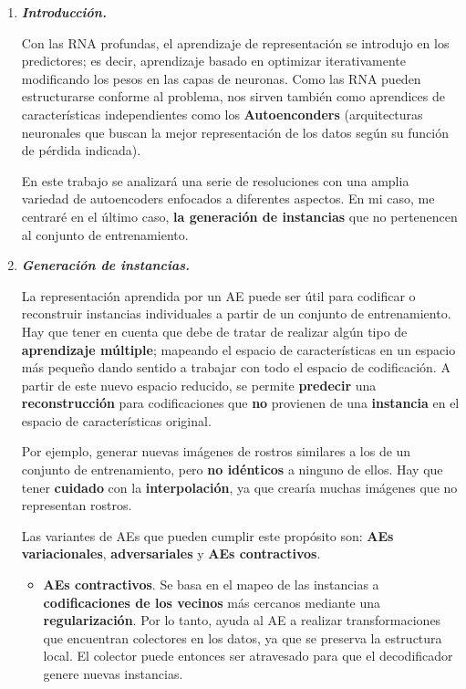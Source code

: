 \begin{enumerate}
    \item \textbf{\textit{Introducción.}}
    \par
    Con las RNA profundas, el aprendizaje de representación se introdujo en los predictores; es decir, aprendizaje basado en optimizar iterativamente modificando los pesos en las capas de neuronas. Como las RNA pueden estructurarse conforme al problema, nos sirven también como aprendices de características independientes como los \textbf{Autoenconders} (arquitecturas neuronales que buscan la mejor representación de los datos según su función de pérdida indicada).
    
    En este trabajo se analizará una serie de resoluciones con una amplia variedad de autoencoders enfocados a diferentes aspectos. En mi caso, me centraré en el último caso, \textbf{la generación de instancias} que no pertenencen al conjunto de entrenamiento. 
    
    \vspace{5mm}
    \item\textbf{\textit{Generación de instancias.}}
    
    La representación aprendida por un AE puede ser útil para codificar o reconstruir instancias individuales a partir de un conjunto de entrenamiento. Hay que tener en cuenta que debe de tratar de realizar algún tipo de \textbf{aprendizaje múltiple}; mapeando el espacio de características en un espacio más pequeño dando sentido a trabajar con todo el espacio de codificación. A partir de este nuevo espacio reducido, se permite \textbf{predecir} una \textbf{reconstrucción} para codificaciones que \textbf{no} provienen de una \textbf{instancia} en el espacio de características original.
    
    Por ejemplo, generar nuevas imágenes de rostros similares a los de un conjunto de entrenamiento, pero \textbf{no idénticos} a ninguno de ellos. Hay que tener \textbf{cuidado} con la \textbf{interpolación}, ya que crearía muchas imágenes que no representan rostros. 
    
    Las variantes de AEs que pueden cumplir este propósito son: \textbf{AEs variacionales}, \textbf{adversariales} y \textbf{AEs contractivos}.
    
    \newpage
    
    \begin{itemize}
        \vspace{5mm}
        \item \textbf{AEs contractivos}. Se basa en el mapeo de las instancias a \textbf{codificaciones de los vecinos} más cercanos mediante una \textbf{regularización}. Por lo tanto, ayuda al AE a realizar transformaciones que encuentran colectores en los datos, ya que se preserva la estructura local. El colector puede entonces ser atravesado para que el decodificador genere nuevas instancias. 
        

\end{itemize}
\end{enumerate}
